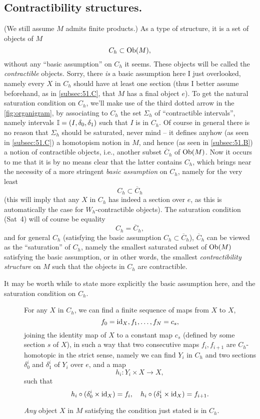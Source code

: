 \subsection[Contractibility structures]{Contractibility structures.}
\label{subsec:51.D}
(We still assume $M$ admits finite products.) As a type of structure,
it is a set of objects of $M$
\[ C_h\subset \operatorname{Ob}(M),\]
without any ``basic assumption'' on $C_h$ it seems. These objects will
be called the \emph{contractible} objects. Sorry, there \emph{is} a
basic assumption here I just overlooked, namely every $X$ in $C_h$
should have at least one section (thus I better assume beforehand, as
in \ref{subsec:51.C}, that $M$ has a final object $e$). To get the
natural saturation condition on $C_h$, we'll make use of the third
dotted arrow in the \ref{fig:organigram}, by associating to $C_h$ the set
$\Sigma_h$ of ``contractible intervals'', namely intervals
${\mathbb{I}}=(I,\delta_0,\delta_1)$ such that $I$ is in $C_h$. Of course in
general there is no reason that $\Sigma_h$ should be saturated, never
mind -- it defines anyhow (as seen in \ref{subsec:51.C}) a homotopism
notion in $M$, and hence (as seen in \ref{subsec:51.B}) a notion of
contractible objects, i.e., another subset $\overline C_h$ of
$\operatorname{Ob}(M)$. Now it occurs to me that it is by no means clear that the
latter contains $C_h$, which brings near the necessity of a more
stringent \emph{basic assumption} on $C_h$, namely for the very least
\[ C_h \subset \overline C_h\]
(this will imply that any $X$ in $C_h$ has indeed a section over $e$,
as this is automatically the case for $W_h$-contractible objects). The
saturation condition (Sat~4) will of course be equality
\[ C_h = \overline C_h,\]
and for general $C_h$ (satisfying the basic assumption
$C_h\subset\overline C_h$), $\overline C_h$ can be viewed as the
``saturation'' of $C_h$, namely the smallest saturated subset of
$\operatorname{Ob}(M)$ satisfying the basic assumption, or in other words, the
smallest \emph{contractibility structure} on $M$ such that the objects
in $C_h$ are contractible.

It may be worth while to state more explicitly the basic assumption
here, and the saturation condition on $C_h$.
\begin{description}
\item[]
  For any $X$ in $C_h$, we can find a finite sequence of maps from $X$
  to $X$,
  \[ f_0=\operatorname{id}_X,f_1,\dots,f_N=c_s,\]
  joining the identity map of $X$ to a constant map $c_s$ (defined by
  some section $s$ of $X$), in such a way that two consecutive maps
  $f_i,f_{i+1}$ are $C_h$-homotopic in the strict sense, namely we can
  find $Y_i$ in $C_h$ and two sections $\delta_0^i$ and $\delta_1^i$
  of $Y_i$ over $e$, and a map
  \[ h_i : Y_i\times X\to X,\]
  such that
  \[ h_i\circ(\delta_0^i\times\operatorname{id}_X)=f_i,\quad
  h_i\circ(\delta_1^i\times\operatorname{id}_X)=f_{i+1}.\]
\item[]
  \emph{Any} object $X$ in $M$ satisfying the condition just stated is
  in $C_h$.
\end{description}

